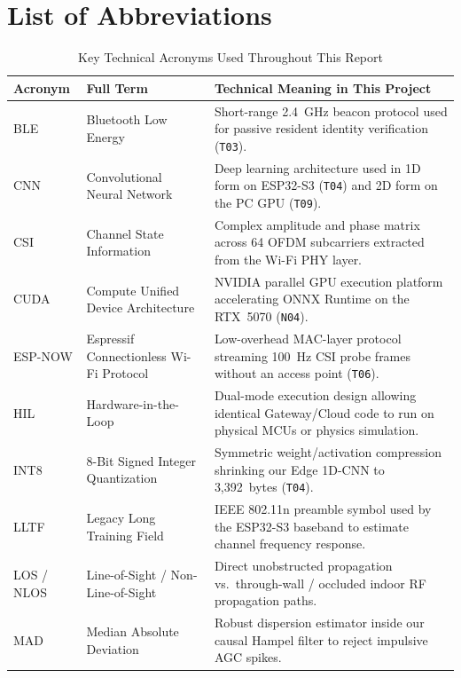\documentclass{hcmut-report}
\renewcommand{\arraystretch}{1.24}
\begin{document}
\section*{List of Abbreviations}
\vspace{-0.3cm}
\begin{table}[H]
\centering
\caption{Key Technical Acronyms Used Throughout This Report}
\label{tab:abbreviations}
\footnotesize
\renewcommand{\arraystretch}{1.00}
\begin{tabularx}{\textwidth}{|P{2.4cm}|P{5.5cm}|Y|}
\hline
\textbf{Acronym} & \textbf{Full Term} & \textbf{Technical Meaning in This Project} \\
\hline
BLE & Bluetooth Low Energy & Short-range 2.4~GHz beacon protocol used for passive resident identity verification (\texttt{T03}). \\
\hline
CNN & Convolutional Neural Network & Deep learning architecture used in 1D form on ESP32-S3 (\texttt{T04}) and 2D form on the PC GPU (\texttt{T09}). \\
\hline
CSI & Channel State Information & Complex amplitude and phase matrix across 64 OFDM subcarriers extracted from the Wi-Fi PHY layer. \\
\hline
CUDA & Compute Unified Device Architecture & NVIDIA parallel GPU execution platform accelerating ONNX Runtime on the RTX~5070 (\texttt{N04}). \\
\hline
ESP-NOW & Espressif Connectionless Wi-Fi Protocol & Low-overhead MAC-layer protocol streaming 100~Hz CSI probe frames without an access point (\texttt{T06}). \\
\hline
HIL & Hardware-in-the-Loop & Dual-mode execution design allowing identical Gateway/Cloud code to run on physical MCUs or physics simulation. \\
\hline
INT8 & 8-Bit Signed Integer Quantization & Symmetric weight/activation compression shrinking our Edge 1D-CNN to 3,392~bytes (\texttt{T04}). \\
\hline
LLTF & Legacy Long Training Field & IEEE 802.11n preamble symbol used by the ESP32-S3 baseband to estimate channel frequency response. \\
\hline
LOS / NLOS & Line-of-Sight / Non-Line-of-Sight & Direct unobstructed propagation vs.\ through-wall / occluded indoor RF propagation paths. \\
\hline
MAD & Median Absolute Deviation & Robust dispersion estimator inside our causal Hampel filter to reject impulsive AGC spikes. \\

\end{tabularx}
\end{table}
\end{document}
